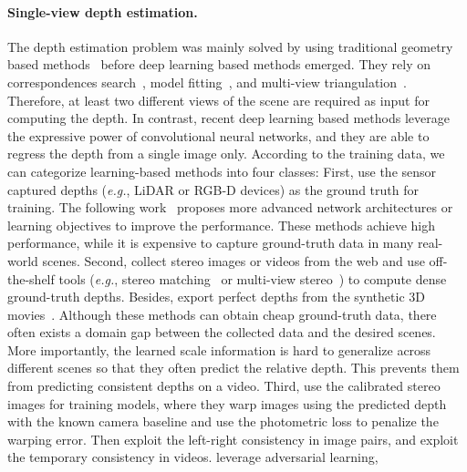 \documentclass[twocolumn]{svjour3}
\renewcommand{\cite}[1]{\textcolor{blue}{\citep{#1}}}
\def\eg{\emph{e.g.}}
\begin{document}
\paragraph{Single-view depth estimation.}
The depth estimation problem was mainly solved by using traditional geometry based methods~\cite{Geiger2011IV, schoenberger2016mvs} before deep learning based methods emerged.
They rely on correspondences search~\cite{lowe2004distinctive, Bian2019gms}, model fitting~\cite{zhang1998determining, bian2019bench}, and multi-view triangulation~\cite{hartley2003multiple}.
Therefore, at least two different views of the scene are required as input for computing the depth.
In contrast, recent deep learning based methods leverage the expressive power of convolutional neural networks,
and they are able to regress the depth from a single image only.
According to the training data, we can categorize learning-based methods into four classes:
First, \cite{eigen2014depth} use the sensor captured depths  (\eg, LiDAR or RGB-D devices) as the ground truth for training.
The following work~\cite{liu2016learning,fu2018deep,garg2019learning,Yin2019enforcing,huynh2020guiding} proposes more advanced network architectures or learning objectives to improve the performance.
These methods achieve high performance, while it is expensive to capture ground-truth data in many real-world scenes.
Second, \cite{xian2018monocular,li2018megadepth,li2019learning,wang2019web,chen2019learning,yin2020learning} collect stereo images or videos from the web and use off-the-shelf tools (\eg, stereo matching~\cite{hirschmuller2005accurate} or multi-view stereo~\cite{schoenberger2016mvs}) to compute dense ground-truth depths.
Besides, \cite{ranftl2020towards} export perfect depths from the synthetic 3D movies~\cite{Butler_ECCV_2012}.
Although these methods can obtain cheap ground-truth data,
there often exists a domain gap between the collected data and the desired scenes.
More importantly, the learned scale information is hard to generalize across different scenes so that they often predict the relative depth.
This prevents them from predicting consistent depths on a video.
Third, \cite{garg2016unsupervised} use the calibrated stereo images for training models,
where they warp images using the predicted depth with the known camera baseline and use the photometric loss to penalize the warping error.
Then \cite{godard2017unsupervised} exploit the left-right consistency in image pairs,
and \cite{zhan2018unsupervised} exploit the temporary consistency in videos.
\cite{pilzer2018unsupervised} leverage adversarial learning,
\end{document}
